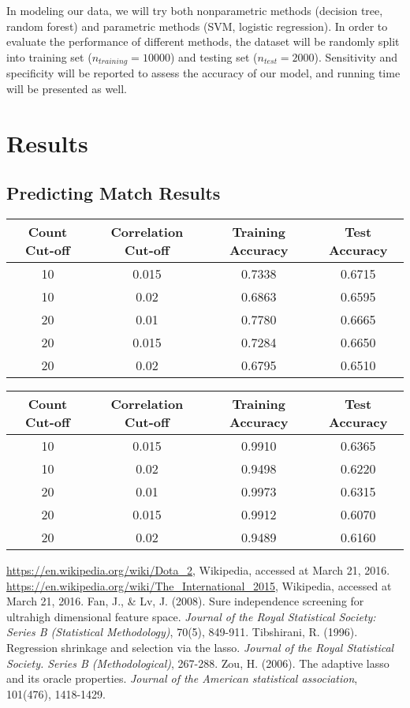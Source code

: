 \documentclass[11pt]{article}
\begin{document}
\noindent In modeling our data, we will try both nonparametric methods (decision tree, random forest) and parametric methods (SVM, logistic regression). In order to evaluate the performance of different methods, the dataset will be randomly split into training set ($n_{training} = 10000$) and testing set ($n_{test} = 2000$). Sensitivity and specificity will be reported to assess the accuracy of our model, and running time will be presented as well. 

\section{Results}
\subsection{Predicting Match Results}
\begin{center}
\begin{tabular}{| c | c | c | c |}\hline
Count Cut-off & Correlation Cut-off & Training Accuracy & Test Accuracy \\\hline
	10 & 0.015 & 0.7338 & 0.6715 \\\hline
	10 & 0.02 & 0.6863 & 0.6595 \\\hline
	20 & 0.01 & 0.7780 & 0.6665 \\\hline
	20 & 0.015 & 0.7284 & 0.6650 \\\hline
	20 & 0.02 & 0.6795 & 0.6510 \\\hline
\end{tabular}

\begin{tabular}{| c | c | c | c |}\hline
	Count Cut-off & Correlation Cut-off & Training Accuracy & Test Accuracy \\\hline
	10 & 0.015 & 0.9910 & 0.6365 \\\hline
	10 & 0.02 & 0.9498 & 0.6220 \\\hline
	20 & 0.01 & 0.9973 & 0.6315 \\\hline
	20 & 0.015 & 0.9912 & 0.6070 \\\hline
	20 & 0.02 & 0.9489 & 0.6160 \\\hline
\end{tabular}
\end{center}

\begin{thebibliography}{9}
	 \url{https://en.wikipedia.org/wiki/Dota_2}, Wikipedia, accessed at March 21, 2016.
	 \url{https://en.wikipedia.org/wiki/The_International_2015}, Wikipedia, accessed at March 21, 2016.
	 Fan, J., \& Lv, J. (2008). Sure independence screening for ultrahigh dimensional feature space. \emph{Journal of the Royal Statistical Society: Series B (Statistical Methodology)}, 70(5), 849-911.
	 Tibshirani, R. (1996). Regression shrinkage and selection via the lasso. \emph{Journal of the Royal Statistical Society. Series B (Methodological)}, 267-288.
	 Zou, H. (2006). The adaptive lasso and its oracle properties. \emph{Journal of the American statistical association}, 101(476), 1418-1429.
\end{thebibliography}
\end{document}
